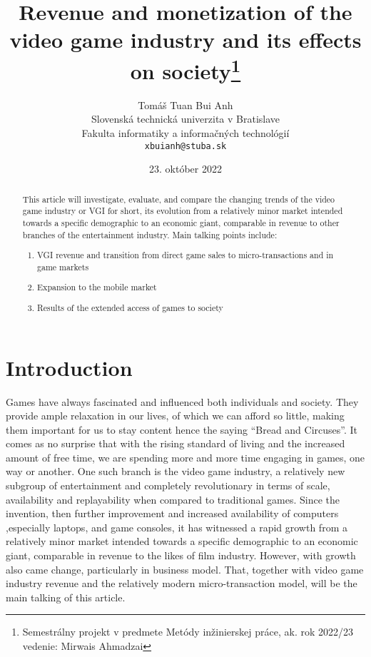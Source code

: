 \documentclass[10pt,british,a4paper,titlepage]{article}
\title{Revenue and monetization of the video game industry and its effects on society\thanks{Semestrálny projekt v predmete Metódy inžinierskej práce, ak. rok 2022/23 \\vedenie: Mirwais Ahmadzai}} %
\author{Tomáš Tuan Bui Anh\\[2pt]
	{\small Slovenská technická univerzita v Bratislave}\\
	{\small Fakulta informatiky a informačných technológií}\\
	{\small \texttt{xbuianh@stuba.sk}}
	}
\date{\small 23. október 2022} %
\begin{document}
\maketitle

\begin{abstract}
This article will investigate, evaluate, and compare the changing trends of the video game industry or VGI for short, its evolution from a relatively minor market intended towards a specific demographic to an economic giant, comparable in revenue to other branches of the entertainment industry. Main talking points include:
\begin{enumerate}
\item VGI revenue and transition from direct game sales to micro-transactions and in game markets
\item Expansion to the mobile market
\item Results of the extended access of games to society 
\end{enumerate}
\end{abstract}



\section{Introduction}

Games have always fascinated and influenced both individuals and society. They provide ample relaxation in our lives, of which we can afford so little, making them important for us to stay content hence the saying “Bread and Circuses”. It comes as no surprise that with the rising standard of living and the increased amount of free time, we are spending more and more time engaging in games, one way or another. One such branch is the video game industry, a relatively new subgroup of entertainment and completely revolutionary in terms of scale, availability and replayability when compared to traditional games. Since the invention, then further improvement and increased availability of computers ,especially laptops, and game consoles, it has witnessed a rapid growth from a relatively minor market intended towards a specific demographic to an economic giant, comparable in revenue to the likes of film industry. However, with growth also came change, particularly in business model. That, together with video game industry revenue and the relatively modern micro-transaction model, will be the main talking of this article.
\end{document}
